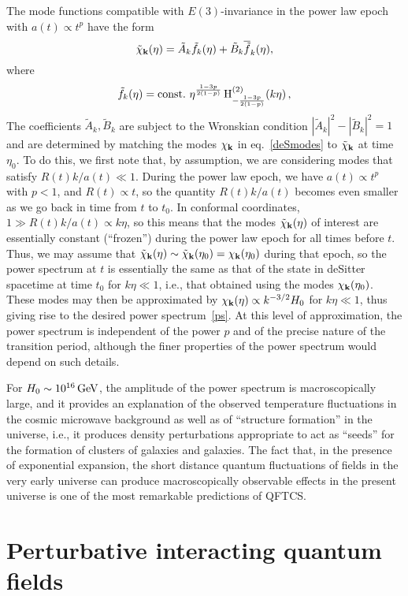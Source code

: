 \documentclass[12pt]{article}
\renewcommand{\k}{{\bf k}}
\theoremstyle{plain}
\theoremstyle{definition}
\def\ben{\begin{equation}}
\def\een{\end{equation}}
\begin{document}
The mode functions compatible with $E(3)$-invariance
in the power law epoch with $a(t) \propto t^p$ have the form
\ben
\tilde \chi_\k(\eta) = \tilde A_k \tilde f_k(\eta) + \tilde B_k \overline{\tilde f}_k(\eta) ,
\een
where
\ben
\tilde f_k(\eta) =
 {\rm const.}  \ \eta^{\frac{1-3p}{2(1-p)}} \, {\rm H}^{(2)}_{-\frac{1-3p}{2(1-p)}}(k\eta) \, ,
\een
The coefficients $\tilde A_k, \tilde B_k$ are subject to the Wronskian condition
$|\tilde A_k|^2-|\tilde B_k|^2=1$ and are determined by matching the modes
$\chi_\k$ in eq.~\eqref{deSmodes}  to
$\tilde \chi_\k$ at time $\eta_0$. To do this, we first note that, by assumption,
we are considering modes that satisfy $R(t)k/a(t) \ll 1$.
During the power law epoch, we have $a(t) \propto t^p$ with
$p<1$, and $R(t) \propto t$, so the quantity $R(t)k/a(t)$ becomes
even smaller as we go back in time from $t$ to $t_0$. In conformal coordinates, 
$1 \gg R(t)k/a(t) \propto k\eta$, so this
means that the modes $\tilde \chi_\k(\eta)$ of interest are essentially constant (``frozen'')
during the power law epoch for all times before $t$. Thus, we may assume
that $\tilde \chi_\k(\eta)\sim \tilde \chi_\k(\eta_0) = \chi_\k(\eta_0)$ during that epoch, so the power
spectrum at $t$ is essentially the same as that of the state
in deSitter spacetime at time $t_0$ for $k\eta \ll 1$, i.e.,
that obtained using the modes $\chi_\k(\eta_0)$. These modes may then be
approximated by $\chi_\k(\eta) \propto k^{-3/2} H_0$ for $k\eta \ll 1$, thus giving rise to
the desired power spectrum~\eqref{ps}. At this level of approximation, the power spectrum is independent of 
the power $p$ and of the precise nature of the transition period, although the finer properties of
the power spectrum would depend on such details.

For $H_0 \sim 10^{16} \, {\rm GeV}$, the
amplitude of the power spectrum 
is macroscopically large, and it provides an explanation of the observed temperature
fluctuations in the cosmic microwave background as well as of ``structure formation'' in the universe,
i.e., it produces density perturbations appropriate to act as ``seeds'' for the formation of clusters of 
galaxies and galaxies. The fact that, in the
presence of exponential expansion, the short distance quantum fluctuations of fields in the very early
universe can produce macroscopically observable effects in the present universe is one of the most
remarkable predictions of QFTCS.

\section{Perturbative interacting quantum fields}
\label{sec3}
\end{document}
